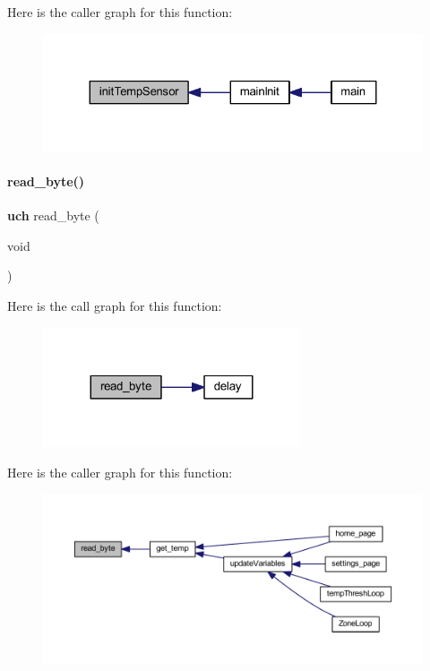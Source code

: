 Here is the caller graph for this function\+:
\nopagebreak
\begin{figure}[H]
\begin{center}
\leavevmode
\includegraphics[width=324pt]{a00050_a6f113d0c9396301bb878730ed4018e44_icgraph}
\end{center}
\end{figure}
\mbox{\label{a00050_ab39a58e9f8e972b890434144956e4f5d}} 
\paragraph{read\+\_\+byte()}
{\footnotesize\ttfamily \textbf{ uch} read\+\_\+byte (\begin{DoxyParamCaption}\item[{void}]{ }\end{DoxyParamCaption})}

Here is the call graph for this function\+:
\nopagebreak
\begin{figure}[H]
\begin{center}
\leavevmode
\includegraphics[width=215pt]{a00050_ab39a58e9f8e972b890434144956e4f5d_cgraph}
\end{center}
\end{figure}
Here is the caller graph for this function\+:
\nopagebreak
\begin{figure}[H]
\begin{center}
\leavevmode
\includegraphics[width=350pt]{a00050_ab39a58e9f8e972b890434144956e4f5d_icgraph}
\end{center}
\end{figure}
\mbox{\label{a00050_a3aea9deb2a0bfea9ff05a898f4822e31}} 
